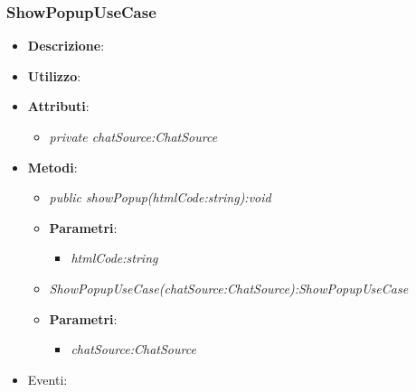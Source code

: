 \subsubsection{ShowPopupUseCase}
\begin{itemize}
\item \textbf{Descrizione}: 
\item \textbf{Utilizzo}:
\item \textbf{Attributi}: 
	\begin{itemize}
	\item \textit{private chatSource:ChatSource}\\
	
	\end{itemize}
\item \textbf{Metodi}:
	\begin{itemize}
	\item \textit{public showPopup(htmlCode:string):void}\\
	
			\item{\textbf{Parametri}: \begin{itemize}
			\item \textit{htmlCode:string}\\

			\end{itemize}}
			
	\item \textit{ShowPopupUseCase(chatSource:ChatSource):ShowPopupUseCase}\\
	
		\item{\textbf{Parametri}: \begin{itemize}
		\item \textit{chatSource:ChatSource}\\
		
		\end{itemize}}

	\end{itemize}
\item{Eventi}:
\end{itemize}

